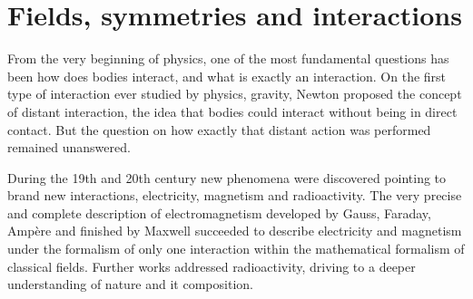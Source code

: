 \section{Fields, symmetries and interactions}
\label{sec:symm}

From the very beginning of physics, one of the most fundamental questions has been how does bodies interact, and what is exactly an interaction. On the first type of interaction ever studied by physics, gravity, Newton proposed the concept of distant interaction, the idea that bodies could interact without being in direct contact. But the question on how exactly that distant action was performed remained unanswered. 

During the 19th and 20th century new phenomena were discovered pointing to brand new interactions, electricity, magnetism and radioactivity. The very precise and complete description of electromagnetism developed by Gauss, Faraday, Amp\`{e}re and finished by Maxwell succeeded to describe electricity and magnetism under the formalism of only one interaction within the mathematical formalism of classical fields. Further works addressed radioactivity, driving to a deeper understanding of nature and it composition.


